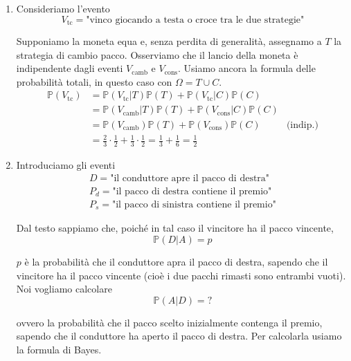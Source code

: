 \begin{enumerate}
\item Consideriamo l'evento\begin{equation*}
V_{\text{tc}} =\text{"vinco giocando a testa o croce tra le due strategie"}
\end{equation*}

Supponiamo la moneta equa e, senza perdita di generalità, assegnamo a $T$ la strategia di cambio pacco. Osserviamo che il lancio della moneta è indipendente dagli eventi $V_{\text{camb}}$ e $V_{\text{cons}}$. Usiamo ancora la formula delle probabilità totali, in questo caso con $\Omega =T\cup C$.\begin{equation*}
\begin{aligned}
\mathbb{P}( V_{\text{tc}}) & =\mathbb{P}( V_{\text{tc}} |T)\mathbb{P}( T) +\mathbb{P}( V_{\text{tc}} |C)\mathbb{P}( C) & \\
 & =\mathbb{P}( V_{\text{camb}} |T)\mathbb{P}( T) +\mathbb{P}( V_{\text{cons}} |C)\mathbb{P}( C) & \\
 & =\mathbb{P}( V_{\text{camb}})\mathbb{P}( T) +\mathbb{P}( V_{\text{cons}})\mathbb{P}( C) & \text{(indip.)}\\
 & =\frac{2}{3} \cdotp \frac{1}{2} +\frac{1}{3} \cdotp \frac{1}{2} =\frac{1}{3} +\frac{1}{6} =\frac{1}{2} & 
\end{aligned}
\end{equation*}
\item Introduciamo gli eventi\begin{gather*}
D=\text{"il conduttore apre il pacco di destra"}\\
P_{d} =\text{"il pacco di destra contiene il premio"}\\
P_{s} =\text{"il pacco di sinistra contiene il premio"}
\end{gather*}

Dal testo sappiamo che, poiché in tal caso il vincitore ha il pacco vincente,\begin{equation*}
\boxed{\mathbb{P}( D|A) =p}
\end{equation*}

$p$ è la probabilità che il conduttore apra il pacco di destra, sapendo che il vincitore ha il pacco vincente (cioè i due pacchi rimasti sono entrambi vuoti). Noi vogliamo calcolare\begin{equation*}
\boxed{\mathbb{P}( A|D) =?}
\end{equation*}

ovvero la probabilità che il pacco scelto inizialmente contenga il premio, sapendo che il conduttore ha aperto il pacco di destra. Per calcolarla usiamo la formula di Bayes.


\end{enumerate}
